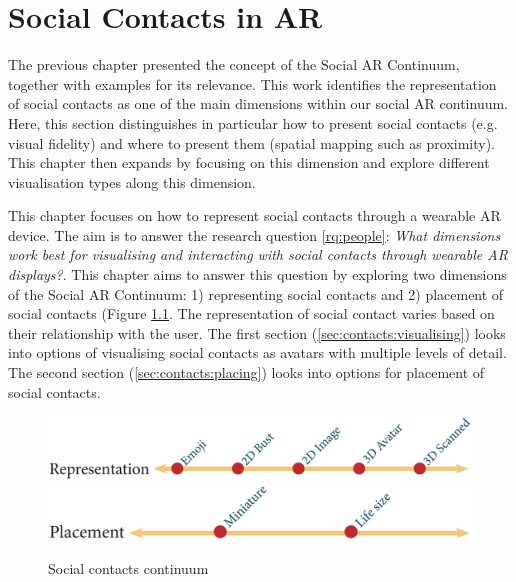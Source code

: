 \chapter{Social Contacts in AR}
\label{ch:contacts} 

The previous chapter presented the concept of the Social AR Continuum, together with examples for its relevance. This work identifies the representation of social contacts as one of the main dimensions within our social AR continuum. Here, this section distinguishes in particular how to present social contacts (e.g. visual fidelity) and where to present them (spatial mapping such as proximity). This chapter then expands by focusing on this dimension and explore different visualisation types along this dimension. 

This chapter focuses on how to represent social contacts through a wearable AR device. The aim is to answer the research question \ref{rq:people}: \textit{What dimensions work best for visualising and interacting with social contacts through wearable AR displays?}. This chapter aims to answer this question by exploring two dimensions of the Social AR Continuum: 1) representing social contacts and 2) placement of social contacts (Figure \ref{fig:contacts:contacts-continuum}. The representation of social contact varies based on their relationship with the user. 
The first section (\ref{sec:contacts:visualising}) looks into options of visualising social contacts as avatars with multiple levels of detail. The second section (\ref{sec:contacts:placing}) looks into options for placement of social contacts. 

\begin{figure}[h]
  \centering
  \includegraphics[width=\columnwidth]{images/continuum/continuum4.2-01.eps}
  \includegraphics[width=\columnwidth]{images/continuum/continuum4.2-02.eps}
  \caption{Social contacts continuum}
  \label{fig:contacts:contacts-continuum}
\end{figure}





